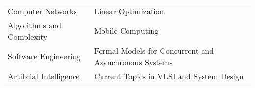 
 \hfill \\[-0.1cm]
\hspace*{0.7cm}\begin{tabular}{ll}
	Computer Networks & Linear Optimization\\
	Algorithms and Complexity \hspace*{2cm}& Mobile Computing\\
	Software Engineering & Formal Models for Concurrent and Asynchronous Systems\\
	Artificial Intelligence & Current Topics in VLSI and System Design\\[0.1cm]
\end{tabular}

